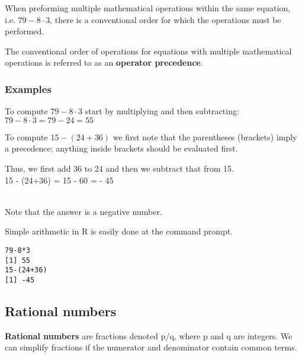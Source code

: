 \documentclass[12pt,a4paper]{article}
\theoremstyle{regla}
\theoremstyle{remark}
\theoremstyle{definition}
\theoremstyle{nonumberbreak}
\begin{document}
When preforming multiple mathematical operations within the same equation, i.e. $79 - 8\cdot 3$, there is a conventional order for which the operations must be performed.  

\begin{defn}
The conventional order of operations for equations with multiple mathematical operations is referred to as an \textbf{operator precedence}.
\end {defn}


\subsubsection{Examples}
\begin{xmpl}
To compute $79 - 8\cdot 3$ start by multiplying and then subtracting:\\
$79 - 8\cdot 3 = 79-24 = 55$
\end{xmpl} 
\begin{xmpl} 
To compute $15 - (24 + 36)$ we first note that the parentheses (brackets) imply a precedence; anything inside brackets should be evaluated first.

Thus, we first add 36 to 24 and then we subtract that from 15.\\ 
15 - (24+36) = 15 - 60 = - 45\\\

Note that the answer is a negative number. 
\end{xmpl} 
\begin{xmpl} 
Simple arithmetic in R is easily done at the command prompt.
\begin{verbatim}
79-8*3
[1] 55
15-(24+36)
[1] -45
\end{verbatim}
\end{xmpl} 


\subsection{Rational numbers}
\begin{fbox}
\begin{minipage}{0.97\textwidth}
{\bf Rational numbers} are fractions denoted p/q, where p and q are integers. We can simplify fractions if the numerator and denominator contain common terms.
\end{minipage}
\end{fbox}
\end{document}
